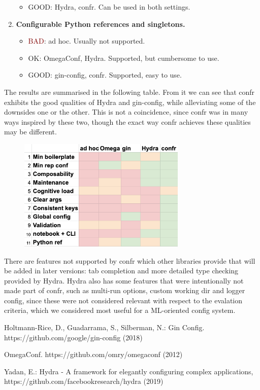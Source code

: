 \documentclass{itatnew}
\begin{document}
\begin{enumerate}
\begin{itemize}
            \item \textcolor{OliveGreen}{GOOD}: Hydra, confr. Can be used in both settings.
        \end{itemize}
    \item \textbf{Configurable Python references and singletons.}
        \begin{itemize}
            \item \textcolor{Maroon}{BAD}: ad hoc. Usually not supported.
            \item \textcolor{YellowOrange}{OK}: OmegaConf, Hydra. Supported, but cumbersome to use.
            \item \textcolor{OliveGreen}{GOOD}: gin-config, confr. Supported, easy to use.
        \end{itemize}
\end{enumerate}


The results are summarised in the following table.
From it we can see that confr exhibits the good qualities of Hydra and gin-config, while alleviating some of the downsides one or the other.
This is not a coincidence, since confr was in many ways inspired by these two, though the exact way confr achieves these qualities may be different.

\begin{figure}[H]
    \centering
    \includegraphics[width=8cm]{eval.png}
\end{figure}

There are features not supported by confr which other libraries provide that will be added in later versions: tab completion and more detailed type checking provided by Hydra. Hydra also has some features that were intentionally not made part of confr, such as multi-run options, custom working dir and logger config, since these were not considered relevant with respect to the evalation criteria, which we considered most useful for a ML-oriented config system.


\begin{thebibliography}{5}

Holtmann-Rice, D., Guadarrama, S., Silberman, N.:
Gin Config.
https://github.com/google/gin-config (2018)

OmegaConf.
https://github.com/omry/omegaconf (2012)

Yadan, E.:
Hydra - A framework for elegantly configuring complex applications,
https://github.com/facebookresearch/hydra (2019)

\end{thebibliography}
\end{document}
